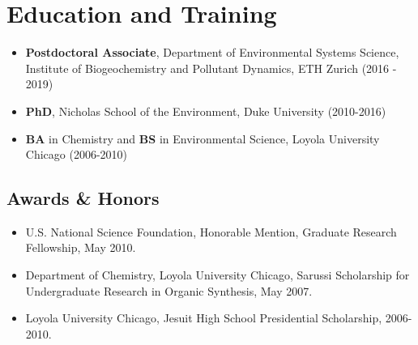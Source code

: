 \documentclass[letterpaper,10pt]{article}
\begin{document}
\section{Education and Training}
\begin{itemize}
	\item {\bfseries Postdoctoral Associate}, Department of Environmental Systems Science, Institute of Biogeochemistry and Pollutant Dynamics, ETH Zurich (2016 - 2019)
	\item {\bfseries PhD}, Nicholas School of the Environment, Duke University (2010-2016)
	\item {\bfseries BA} in Chemistry and {\bfseries BS} in Environmental Science, Loyola University Chicago (2006-2010)
\end{itemize}
\begin{center}
\section{Awards \& Honors}
\begin{itemize}
\item U.S. National Science Foundation, Honorable Mention, Graduate Research Fellowship, May 2010.
\item Department of Chemistry, Loyola University Chicago, Sarussi Scholarship for Undergraduate Research in Organic Synthesis, May 2007. 
\item Loyola University Chicago, Jesuit High School Presidential Scholarship, 2006-2010. 
\end{itemize}
\end{center}
%
%
%
\end{document}

